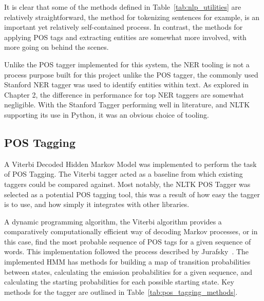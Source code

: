 \documentclass[10pt]{report}
\begin{document}
It is clear that some of the methods defined in Table~\ref{tab:nlp_utilities} are relatively straightforward, the method for tokenizing sentences for example, is an important yet relatively self-contained process. In contrast, the methods for applying POS tags and extracting entities  are somewhat more involved, with more going on behind the scenes.

Unlike the POS tagger implemented for this system, the NER tooling is not a process purpose built for this project unlike the POS tagger, the commonly used Stanford NER tagger was used to identify entities within text. As explored in Chapter 2, the difference in performance for top NER taggers are somewhat negligible. With the Stanford Tagger performing well in literature, and NLTK supporting its use in Python, it was an obvious choice of tooling.

\subsection{POS Tagging}
A Viterbi Decoded Hidden Markov Model was implemented to perform the task of POS Tagging. The Viterbi tagger acted as a baseline from which existing taggers could be compared against. Most notably, the NLTK POS Tagger was selected as a potential POS tagging tool, this was a result of how easy the tagger is to use, and how simply it integrates with other libraries.

A dynamic programming algorithm, the Viterbi algorithm provides a comparatively computationally efficient way of decoding Markov processes, or in this case, find the most probable sequence of POS tags for a given sequence of words. This implementation followed the process described by Jurafsky~\cite{Jurafsky2014-yb}. The implemented HMM has methods for building a map of transition probabilities between states, calculating the emission probabilities for a given sequence, and calculating the starting probabilities for each possible starting state. Key methods for the tagger are outlined in Table~\ref{tab:pos_tagging_methods}.
\end{document}
